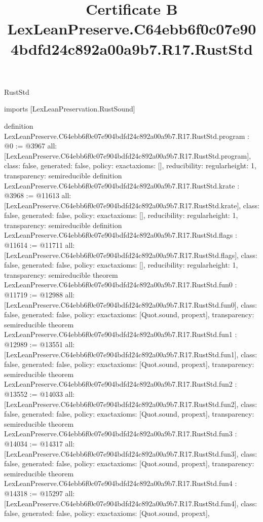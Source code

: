 \begin{lexlean}{RustStd}
\title{Certificate B LexLeanPreserve.C64ebb6f0c07e904bdfd24c892a00a9b7.R17.RustStd}
\begin{coremodule}
imports [LexLeanPreservation.RustSound]

definition LexLeanPreserve.C64ebb6f0c07e904bdfd24c892a00a9b7.R17.RustStd.program : @0 := @3967 {
  all: [LexLeanPreserve.C64ebb6f0c07e904bdfd24c892a00a9b7.R17.RustStd.program],
  class: false,
  generated: false,
  policy: exact{axioms: []},
  reducibility: regular{height: 1},
  transparency: semireducible
}
definition LexLeanPreserve.C64ebb6f0c07e904bdfd24c892a00a9b7.R17.RustStd.krate : @3968 := @11613 {
  all: [LexLeanPreserve.C64ebb6f0c07e904bdfd24c892a00a9b7.R17.RustStd.krate],
  class: false,
  generated: false,
  policy: exact{axioms: []},
  reducibility: regular{height: 1},
  transparency: semireducible
}
definition LexLeanPreserve.C64ebb6f0c07e904bdfd24c892a00a9b7.R17.RustStd.flags : @11614 := @11711 {
  all: [LexLeanPreserve.C64ebb6f0c07e904bdfd24c892a00a9b7.R17.RustStd.flags],
  class: false,
  generated: false,
  policy: exact{axioms: []},
  reducibility: regular{height: 1},
  transparency: semireducible
}
theorem LexLeanPreserve.C64ebb6f0c07e904bdfd24c892a00a9b7.R17.RustStd.fun0 : @11719 := @12988 {
  all: [LexLeanPreserve.C64ebb6f0c07e904bdfd24c892a00a9b7.R17.RustStd.fun0],
  class: false,
  generated: false,
  policy: exact{axioms: [Quot.sound, propext]},
  transparency: semireducible
}
theorem LexLeanPreserve.C64ebb6f0c07e904bdfd24c892a00a9b7.R17.RustStd.fun1 : @12989 := @13551 {
  all: [LexLeanPreserve.C64ebb6f0c07e904bdfd24c892a00a9b7.R17.RustStd.fun1],
  class: false,
  generated: false,
  policy: exact{axioms: [Quot.sound, propext]},
  transparency: semireducible
}
theorem LexLeanPreserve.C64ebb6f0c07e904bdfd24c892a00a9b7.R17.RustStd.fun2 : @13552 := @14033 {
  all: [LexLeanPreserve.C64ebb6f0c07e904bdfd24c892a00a9b7.R17.RustStd.fun2],
  class: false,
  generated: false,
  policy: exact{axioms: [Quot.sound, propext]},
  transparency: semireducible
}
theorem LexLeanPreserve.C64ebb6f0c07e904bdfd24c892a00a9b7.R17.RustStd.fun3 : @14034 := @14317 {
  all: [LexLeanPreserve.C64ebb6f0c07e904bdfd24c892a00a9b7.R17.RustStd.fun3],
  class: false,
  generated: false,
  policy: exact{axioms: [Quot.sound, propext]},
  transparency: semireducible
}
theorem LexLeanPreserve.C64ebb6f0c07e904bdfd24c892a00a9b7.R17.RustStd.fun4 : @14318 := @15297 {
  all: [LexLeanPreserve.C64ebb6f0c07e904bdfd24c892a00a9b7.R17.RustStd.fun4],
  class: false,
  generated: false,
  policy: exact{axioms: [Quot.sound, propext]},
}
\end{coremodule}
\end{lexlean}
